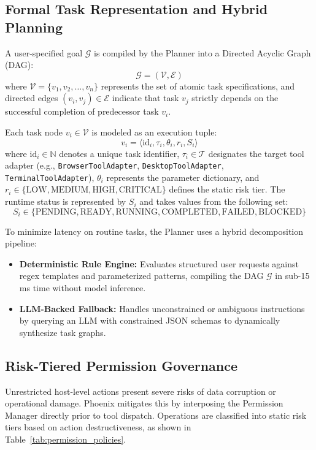 \documentclass[conference]{IEEEtran}
\begin{document}
\subsection{Formal Task Representation and Hybrid Planning}
A user-specified goal $\mathcal{G}$ is compiled by the Planner into a Directed Acyclic Graph (DAG):
\begin{equation}
\mathcal{G} = (\mathcal{V}, \mathcal{E})
\end{equation}
where $\mathcal{V} = \{v_1, v_2, \dots, v_n\}$ represents the set of atomic task specifications, and directed edges $(v_i, v_j) \in \mathcal{E}$ indicate that task $v_j$ strictly depends on the successful completion of predecessor task $v_i$.

Each task node $v_i \in \mathcal{V}$ is modeled as an execution tuple:
\begin{equation}
v_i = \langle \text{id}_i, \tau_i, \theta_i, r_i, S_i \rangle
\end{equation}
where $\text{id}_i \in \mathbb{N}$ denotes a unique task identifier, $\tau_i \in \mathcal{T}$ designates the target tool adapter (e.g., \texttt{BrowserToolAdapter}, \texttt{DesktopToolAdapter}, \texttt{TerminalToolAdapter}), $\theta_i$ represents the parameter dictionary, and $r_i \in \{\text{LOW}, \text{MEDIUM}, \text{HIGH}, \text{CRITICAL}\}$ defines the static risk tier. The runtime status is represented by $S_i$ and takes values from the following set:
\begin{equation}
S_i \in \{\text{PENDING}, \text{READY}, \text{RUNNING}, \text{COMPLETED}, \text{FAILED}, \text{BLOCKED}\}
\end{equation}

To minimize latency on routine tasks, the Planner uses a hybrid decomposition pipeline:
\begin{itemize}
    \item \textbf{Deterministic Rule Engine:} Evaluates structured user requests against regex templates and parameterized patterns, compiling the DAG $\mathcal{G}$ in sub-15 ms time without model inference.
    \item \textbf{LLM-Backed Fallback:} Handles unconstrained or ambiguous instructions by querying an LLM with constrained JSON schemas to dynamically synthesize task graphs.
\end{itemize}

\subsection{Risk-Tiered Permission Governance}
Unrestricted host-level actions present severe risks of data corruption or operational damage. Phoenix mitigates this by interposing the Permission Manager directly prior to tool dispatch. Operations are classified into static risk tiers based on action destructiveness, as shown in Table~\ref{tab:permission_policies}.
\end{document}
